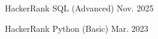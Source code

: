 

\begin{cventries}

  \cventry
    {HackerRank} %
    {SQL (Advanced)} %
    {} %
    {Nov. 2025} %
    {} %

  \cventry
    {HackerRank} %
    {Python (Basic)} %
    {} %
    {Mar. 2023} %
    {} %

\end{cventries}
